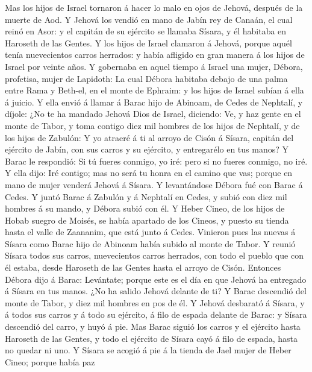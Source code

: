  Mas los hijos de Israel tornaron á hacer lo malo en ojos de
Jehová, después de la muerte de Aod.  Y Jehová los vendió en
mano de Jabín rey de Canaán, el cual reinó en Asor: y el capitán de su
ejército se llamaba Sísara, y él habitaba en Haroseth de las Gentes.
 Y los hijos de Israel clamaron á Jehová, porque aquél tenía
nuevecientos carros herrados: y había afligido en gran manera á los
hijos de Israel por veinte años.  Y gobernaba en aquel
tiempo á Israel una mujer, Débora, profetisa, mujer de Lapidoth:
 La cual Débora habitaba debajo de una palma entre Rama y
Beth-el, en el monte de Ephraim: y los hijos de Israel subían á ella á
juicio.  Y ella envió á llamar á Barac hijo de Abinoam, de
Cedes de Nephtalí, y díjole: ¿No te ha mandado Jehová Dios de Israel,
diciendo: Ve, y haz gente en el monte de Tabor, y toma contigo diez mil
hombres de los hijos de Nephtalí, y de los hijos de Zabulón:
 Y yo atraeré á ti al arroyo de Cisón á Sísara, capitán del
ejército de Jabín, con sus carros y su ejército, y entregarélo en tus
manos?  Y Barac le respondió: Si tú fueres conmigo, yo iré:
pero si no fueres conmigo, no iré.  Y ella dijo: Iré
contigo; mas no será tu honra en el camino que vas; porque en mano de
mujer venderá Jehová á Sísara. Y levantándose Débora fué con Barac á
Cedes.  Y juntó Barac á Zabulón y á Nephtalí en Cedes, y
subió con diez mil hombres á su mando, y Débora subió con él.
 Y Heber Cineo, de los hijos de Hobab suegro de Moisés, se
había apartado de los Cineos, y puesto su tienda hasta el valle de
Zaananim, que está junto á Cedes.  Vinieron pues las nuevas
á Sísara como Barac hijo de Abinoam había subido al monte de Tabor.
 Y reunió Sísara todos sus carros, nuevecientos carros
herrados, con todo el pueblo que con él estaba, desde Haroseth de las
Gentes hasta el arroyo de Cisón.  Entonces Débora dijo á
Barac: Levántate; porque este es el día en que Jehová ha entregado á
Sísara en tus manos. ¿No ha salido Jehová delante de ti? Y Barac
descendió del monte de Tabor, y diez mil hombres en pos de él.
 Y Jehová desbarató á Sísara, y á todos sus carros y á todo
su ejército, á filo de espada delante de Barac: y Sísara descendió del
carro, y huyó á pie.  Mas Barac siguió los carros y el
ejército hasta Haroseth de las Gentes, y todo el ejército de Sísara cayó
á filo de espada, hasta no quedar ni uno.  Y Sísara se
acogió á pie á la tienda de Jael mujer de Heber Cineo; porque había paz
